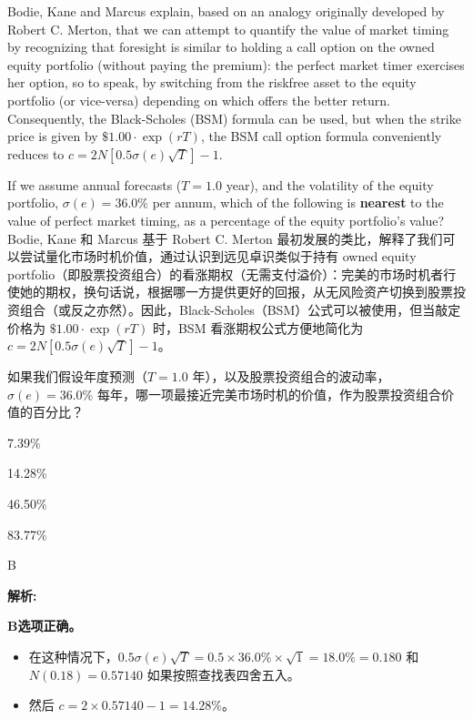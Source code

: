 \documentclass{article}
\newcounter{question} %
\newenvironment{explanation}
{\textbf{解析:}\par}
{\par}
\begin{document}
\begin{question}
    Bodie, Kane and Marcus explain, based on an analogy originally developed by Robert C. Merton, that we can attempt to quantify the value of market timing by recognizing that foresight is similar to holding a call option on the owned equity portfolio (without paying the premium): the perfect market timer exercises her option, so to speak, by switching from the riskfree asset to the equity portfolio (or vice-versa) depending on which offers the better return. Consequently, the Black-Scholes (BSM) formula can be used, but when the strike price is given by $\$1.00 \cdot \exp(rT)$, the BSM call option formula conveniently reduces to $c = 2 N[0.5 \sigma(e) \sqrt{T}] - 1$.

    If we assume annual forecasts ($T = 1.0$ year), and the volatility of the equity portfolio, $\sigma(e) = 36.0\%$ per annum, which of the following is \textbf{nearest} to the value of perfect market timing, as a percentage of the equity portfolio’s value?\\

    Bodie, Kane 和 Marcus 基于 Robert C. Merton 最初发展的类比，解释了我们可以尝试量化市场时机价值，通过认识到远见卓识类似于持有 owned equity portfolio（即股票投资组合）的看涨期权（无需支付溢价）：完美的市场时机者行使她的期权，换句话说，根据哪一方提供更好的回报，从无风险资产切换到股票投资组合（或反之亦然）。因此，Black-Scholes（BSM）公式可以被使用，但当敲定价格为 $\$1.00 \cdot \exp(rT)$ 时，BSM 看涨期权公式方便地简化为 $c = 2 N[0.5 \sigma(e) \sqrt{T}] - 1$。

    如果我们假设年度预测（$T = 1.0$ 年），以及股票投资组合的波动率，$\sigma(e) = 36.0\%$ 每年，哪一项最接近完美市场时机的价值，作为股票投资组合价值的百分比？
\end{question}

\begin{choices}
    \item 7.39\%
    \item 14.28\%
    \item 46.50\%
    \item 83.77\%
\end{choices}

\begin{correctanswer}
    B
\end{correctanswer}

\begin{explanation}
    \textbf{B选项正确。} 
    \begin{itemize}
        \item 在这种情况下，$0.5 \sigma(e) \sqrt{T} = 0.5 \times 36.0\% \times \sqrt{1} = 18.0\% = 0.180$ 和 $N(0.18) = 0.57140$ 如果按照查找表四舍五入。
        \item 然后 $c = 2 \times 0.57140 - 1 = 14.28\%$。
    \end{itemize}
\end{explanation}
\end{document}
